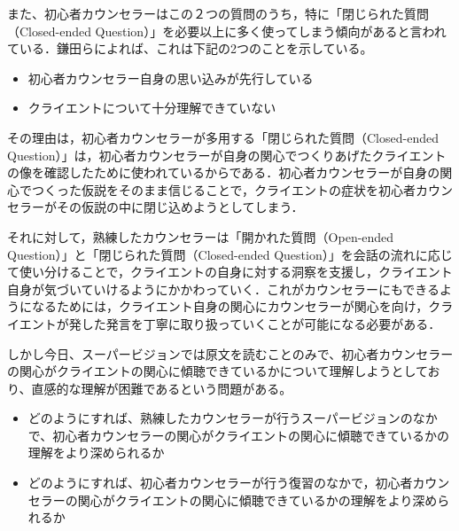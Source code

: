 \documentclass[shuuron]{kuee}
\begin{document}
また、初心者カウンセラーはこの２つの質問のうち，特に「閉じられた質問（Closed-ended Question）」を必要以上に多く使ってしまう傾向があると言われている．鎌田ら\cite{Darshana}によれば、これは下記の2つのことを示している。
\begin{itemize}
  \item 初心者カウンセラー自身の思い込みが先行している
  \item クライエントについて十分理解できていない
\end{itemize}
その理由は，初心者カウンセラーが多用する「閉じられた質問（Closed-ended Question）」は，初心者カウンセラーが自身の関心でつくりあげたクライエントの像を確認したために使われているからである．初心者カウンセラーが自身の関心でつくった仮説をそのまま信じることで，クライエントの症状を初心者カウンセラーがその仮説の中に閉じ込めようとしてしまう．

それに対して，熟練したカウンセラーは「開かれた質問（Open-ended Question）」と「閉じられた質問（Closed-ended Question）」を会話の流れに応じて使い分けることで，クライエントの自身に対する洞察を支援し，クライエント自身が気づいていけるようにかかわっていく．これがカウンセラーにもできるようになるためには，クライエント自身の関心にカウンセラーが関心を向け，クライエントが発した発言を丁寧に取り扱っていくことが可能になる必要がある．

しかし今日、スーパービジョンでは原文を読むことのみで、初心者カウンセラーの関心がクライエントの関心に傾聴できているかについて理解しようとしており、直感的な理解が困難であるという問題がある。
\begin{itemize}
  \item どのようにすれば、熟練したカウンセラーが行うスーパービジョンのなかで、初心者カウンセラーの関心がクライエントの関心に傾聴できているかの理解をより深められるか
  \item どのようにすれば、初心者カウンセラーが行う復習のなかで，初心者カウンセラーの関心がクライエントの関心に傾聴できているかの理解をより深められるか
\end{itemize}





\end{document}
